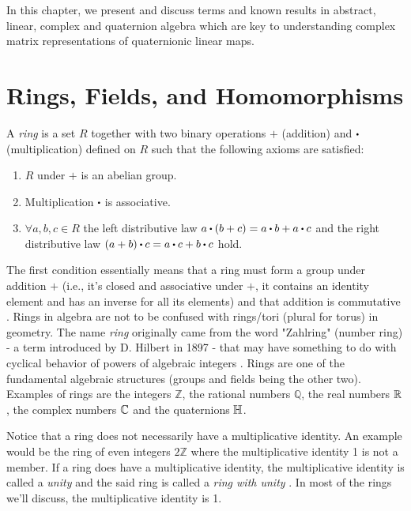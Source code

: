 In this chapter, we present and discuss terms and known results in abstract, linear, complex and quaternion algebra which are key to understanding complex matrix representations of quaternionic linear maps.

\section{Rings, Fields, and Homomorphisms}
\begin{definition}[Ring] \label{def:ring}
	\emph{\cite{fraleigh}} A \emph{ring} is a set $R$ together with two binary operations $+$ (addition) and $\bigcdot$ (multiplication) defined on $R$ such that the following axioms are satisfied:
	\begin{varwidth}[t]{.9\textwidth}
	\centering
\begin{enumerate}
\item $R$ under $+$ is an abelian group.
\item Multiplication $\bigcdot$ is associative.
\item $\forall a,b,c \in R$ the left distributive law $a\bigcdot(b+c)=a\bigcdot b + a\bigcdot c$ and the right distributive law $(a+b)\bigcdot c = a\bigcdot c + b\bigcdot c$ hold.
\end{enumerate}
\end{varwidth}
\newline
\end{definition}

The first condition essentially means that a ring must form a group under addition $+$ (i.e., it's closed and associative under $+$, it contains an identity element and has an inverse for all its elements) and that addition is commutative \cite{fraleigh}. Rings in algebra are not to be confused with rings/tori (plural for torus) in geometry. The name \emph{ring} originally came from the word "Zahlring" (number ring) - a term introduced by D. Hilbert in 1897 - that may have something to do with cyclical behavior of powers of algebraic integers \cite{yrings}. Rings are one of the fundamental algebraic structures (groups and fields being the other two). Examples of rings are the integers $\mathbb{Z}$, the rational numbers $\mathbb{Q}$, the real numbers $\operatorname{\mathbb{R}}$, the complex numbers $\operatorname{\mathbb{C}}$ and the quaternions $\operatorname{\mathbb{H}}$. 

Notice that a ring does not necessarily have a multiplicative identity. An example would be the ring of even integers $2\mathbb{Z}$ where the multiplicative identity 1 is not a member. If a ring does have a multiplicative identity, the multiplicative identity is called a \emph{unity} and the said ring is called a \emph{ring with unity} \cite{fraleigh}. In most of the rings we'll discuss, the multiplicative identity is 1. 

